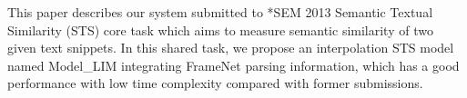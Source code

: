 This paper describes our system submitted to *SEM 2013 Semantic Textual Similarity (STS) core task which aims to measure semantic similarity of two
 given text snippets. In this shared task, we propose an interpolation STS model
 named Model\_LIM integrating FrameNet parsing information, which has a good
 performance with low time complexity compared with former submissions.

